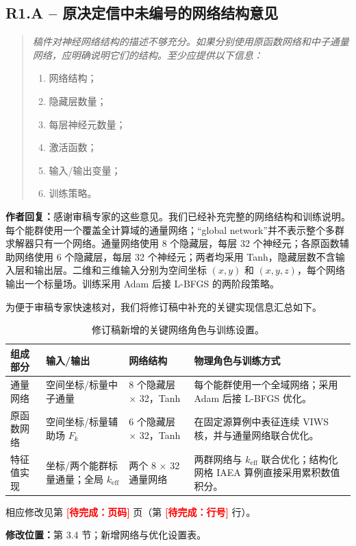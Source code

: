 \documentclass[11pt,a4paper]{article}
\newenvironment{reviewercomment}{\begin{quote}\small\itshape\color{commentgray}}{\end{quote}}
\newcommand{\authorresponse}{\noindent\textbf{作者回复：}\quad}
\newcommand{\revisionlocation}[1]{\par\noindent\textcolor{locationblue}{\textbf{修改位置：}}#1}
\newcommand{\draftplaceholder}[1]{\textcolor{red}{\textbf{[待完成：#1]}}}
\begin{document}
\subsection*{R1.A -- 原决定信中未编号的网络结构意见}
\begin{reviewercomment}
稿件对神经网络结构的描述不够充分。如果分别使用原函数网络和中子通量网络，应明确说明它们的结构。至少应提供以下信息：
\begin{enumerate}[label=\alph*.,leftmargin=2em]
\item 网络结构；
\item 隐藏层数量；
\item 每层神经元数量；
\item 激活函数；
\item 输入/输出变量；
\item 训练策略。
\end{enumerate}
\end{reviewercomment}
\authorresponse 感谢审稿专家的这些意见。我们已经补充完整的网络结构和训练说明。每个能群使用一个覆盖全计算域的通量网络；“global network”并不表示整个多群求解器只有一个网络。通量网络使用 8 个隐藏层，每层 32 个神经元；各原函数辅助网络使用 6 个隐藏层，每层 32 个神经元；两者均采用 Tanh，隐藏层数不含输入层和输出层。二维和三维输入分别为空间坐标 $(x,y)$ 和 $(x,y,z)$，每个网络输出一个标量场。训练采用 Adam 后接 L-BFGS 的两阶段策略。

为便于审稿专家快速核对，我们将修订稿中补充的关键实现信息汇总如下。

\begin{table}[H]
\centering
\small
\caption{修订稿新增的关键网络角色与训练设置。}
\label{tab:response_network_settings_zh}
\renewcommand{\arraystretch}{1.15}
\begin{tabularx}{0.98\textwidth}{@{}p{2.7cm}p{2.6cm}p{2.4cm}X@{}}
\toprule
组成部分 & 输入/输出 & 网络结构 & 物理角色与训练方式 \\
\midrule
通量网络 & 空间坐标/标量中子通量 & 8 个隐藏层 $\times$ 32，Tanh & 每个能群使用一个全域网络；采用 Adam 后接 L-BFGS 优化。 \\
原函数网络 & 空间坐标/标量辅助场 $F_k$ & 6 个隐藏层 $\times$ 32，Tanh & 在固定源算例中表征连续 VIWS 核，并与通量网络联合优化。 \\
特征值实现 & 坐标/两个能群标量通量；全局 $k_{\mathrm{eff}}$ & 两个 8 $\times$ 32 通量网络 & 两群网络与 $k_{\mathrm{eff}}$ 联合优化；结构化网格 IAEA 算例直接采用累积数值积分。 \\
\bottomrule
\end{tabularx}
\end{table}
相应修改见第 \draftplaceholder{页码} 页（第 \draftplaceholder{行号} 行）。
\revisionlocation{第 3.4 节；新增网络与优化设置表。}
\end{document}
